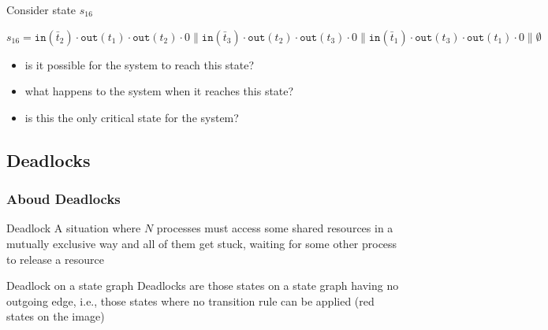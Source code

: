 \documentclass[presentation]{beamer}\mode<presentation>{\usetheme{AMSCesenaPurpleAndGold}}
\begin{document}
\begin{frame}[allowframebreaks]
    \begin{alertblock}{Consider state $s_{16}$}
        \begin{center}
            $s_{16} = \mathtt{in}(\bar{t}_2) \cdot \mathtt{out}(t_1) \cdot \mathtt{out}(t_2) \cdot 0 \parallel \mathtt{in}(\bar{t}_3) \cdot \mathtt{out}(t_2) \cdot \mathtt{out}(t_3) \cdot 0 \parallel \mathtt{in}(\bar{t}_1) \cdot \mathtt{out}(t_3) \cdot \mathtt{out}(t_1) \cdot 0 \parallel \emptyset$
        \end{center}
        \begin{itemize}
            \item is it possible for the system to reach this state?
            \item what happens to the system when it reaches this state?
            \item is this the only critical state for the system?
        \end{itemize}
    \end{alertblock}

\end{frame}

\subsection{Deadlocks}

\begin{frame}
\frametitle{Aboud Deadlocks}
    \begin{block}{Deadlock}
        A situation where $N$ processes must access some shared resources in a mutually exclusive way and all of them get stuck, waiting for some other process to release a resource
    \end{block}
    
    \vfill
    
    \begin{alertblock}{Deadlock on a state graph}
        Deadlocks are those states on a state graph having \alert{no outgoing edge}, i.e., those states where \alert{no transition rule} can be applied (red states on the image)
    \end{alertblock}

\end{frame}
\end{document}
